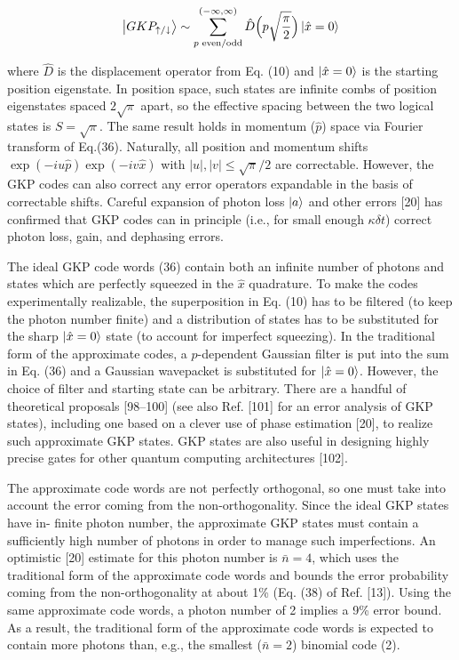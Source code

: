 \documentclass[12]{amsart}
\newcommand\0{\mathbf{0}}
\newcommand\<{\langle}
\renewcommand\>{\rangle}
\begin{document}
\begin{align*}
\ket{GKP_{\uparrow/\downarrow}} \sim \sum_{p\text{ even/odd}}^{(-\infty, \infty)} \hat{D}\Big(p \sqrt{\frac{\pi}{2}} \Big) \ket{\hat{x} = 0} 	
\end{align*}


  where $\hat{D}$ is the displacement operator from Eq. (10) and $\ket{\hat{x} = 0}$ is the starting position eigenstate. In position space, such states are infinite combs of position eigenstates spaced $2\sqrt{\pi}$ apart, so the effective spacing between the two logical states is $S=\sqrt{\pi}$. The same result holds in momentum ($\hat{p}$) space via Fourier transform of Eq.(36). Naturally, all position and momentum shifts $\exp(-iu\hat{p})\exp(-iv\hat{x})$ with $|u|, |v| \leq \sqrt{\pi}/2$ are correctable. However, the GKP codes can also correct any error operators expandable in the basis of correctable shifts. Careful expansion of photon loss $\ket{a}$ and other errors [20] has confirmed that GKP codes can in principle (i.e., for small enough $\kappa \delta t$) correct photon loss, gain, and dephasing errors.
  
The ideal GKP code words (36) contain both an infinite number of photons and states which are perfectly squeezed in the $\hat{x}$ quadrature. To make the codes experimentally realizable, the superposition in Eq. (10) has to be filtered (to keep the photon number finite) and a distribution of states has to be substituted for the sharp $\ket{\hat{x}=0}$ state (to account for imperfect squeezing). In the traditional form of the approximate codes, a $p$-dependent Gaussian filter is put into the sum in Eq. (36) and a Gaussian wavepacket is substituted for $\ket{\hat{x}=0}$. However, the choice of filter and starting state can be arbitrary. There are a handful of theoretical proposals [98–100] (see also Ref. [101] for an error analysis of GKP states), including one based on a clever use of phase estimation [20], to realize such approximate GKP states. GKP states are also useful in designing highly precise gates for other quantum computing architectures [102].

The approximate code words are not perfectly orthogonal, so one must take into account the error coming from the non-orthogonality. Since the ideal GKP states have in- finite photon number, the approximate GKP states must contain a sufficiently high number of photons in order to manage such imperfections. An optimistic [20] estimate for this photon number is $\bar{n} = 4$, which uses the traditional form of the approximate code words and bounds the error probability coming from the non-orthogonality at about 1\% (Eq. (38) of Ref. [13]). Using the same approximate code words, a photon number of 2 implies a 9\% error bound. As a result, the traditional form of the approximate code words is expected to contain more photons than, e.g., the smallest ($\bar{n} = 2$) binomial code (2).
\end{document}
